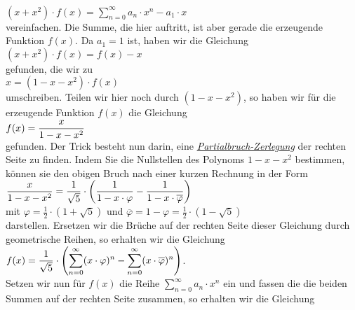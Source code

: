 \\[0.2cm]
\hspace*{1.3cm}
$(x + x^2) \cdot f(x) = \sum\limits_{n=0}^\infty a_{n} \cdot x^n - a_1 \cdot x$ 
\\[0.2cm]
vereinfachen.  Die Summe, die hier auftritt, ist aber gerade die erzeugende Funktion $f(x)$.
Da $a_1 = 1$ ist, haben wir die Gleichung
\\[0.2cm]
\hspace*{1.3cm}
$(x + x^2) \cdot f(x) = f(x) - x$ 
\\[0.2cm]
gefunden, die wir zu
\\[0.2cm]
\hspace*{1.3cm}
$x = (1 - x - x^2) \cdot f(x)$ 
\\[0.2cm]
umschreiben.  Teilen wir hier noch durch $(1-x-x^2)$, so haben wir f\"ur die erzeugende Funktion
$f(x)$ die Gleichung
\\[0.2cm]
\hspace*{1.3cm}
$\displaystyle f(x) = \frac{x}{1 - x - x^2}$
\\[0.2cm]
gefunden.  Der Trick besteht nun darin, eine 
\href{http://de.wikipedia.org/wiki/Partialbruchzerlegung}{\emph{Partialbruch-Zerlegung}} 
der rechten Seite zu finden.  Indem Sie die Nullstellen des Polynoms $1 - x - x^2$ bestimmen, k\"onnen
sie den obigen Bruch nach einer kurzen Rechnung in der Form
\\[0.2cm]
\hspace*{1.3cm}
$\displaystyle \frac{x}{1 - x - x^2} = \frac{1}{\sqrt{5}} \cdot \left(\frac{1}{1 - x \cdot \varphi} - \frac{1}{1 - x \cdot \overline{\varphi}}\right)$
\\[0.2cm]
\hspace*{1.3cm}
mit $\varphi = \frac{1}{2} \cdot (1 + \sqrt{5})$ \quad und \quad  $\overline{\varphi} = 1
-\varphi = \frac{1}{2} \cdot (1 - \sqrt{5})$
\\[0.2cm]
darstellen.  Ersetzen wir die Br\"uche auf der rechten Seite dieser Gleichung durch geometrische
Reihen, so erhalten wir die Gleichung
\\[0.2cm]
\hspace*{1.3cm}
$\displaystyle f(x) = \frac{1}{\sqrt{5}} \cdot \left(\sum\limits_{n=0}^\infty (x \cdot \varphi)^n - \sum\limits_{n=0}^\infty (x \cdot \overline{\varphi})^n \right)$.
\\[0.2cm]
Setzen wir nun f\"ur $f(x)$ die Reihe $\sum\limits_{n=0}^\infty a_n \cdot x^n$ ein und fassen die die
beiden Summen auf der rechten Seite zusammen, so erhalten wir die Gleichung
\\[0.2cm]
\hspace*{1.3cm}
